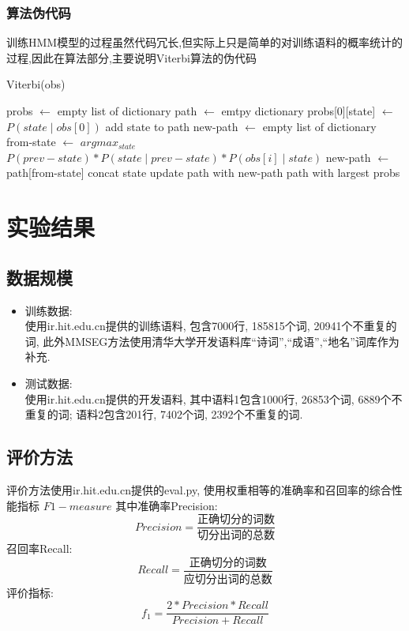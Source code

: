 \documentclass[titlepage]{article}
\begin{document}
\newpage
\subsubsection{算法伪代码}
训练HMM模型的过程虽然代码冗长,但实际上只是简单的对训练语料的概率统计的过程,因此在算法部分,主要说明Viterbi算法的伪代码

\begin{algorithm}[H]
    \renewcommand{\thealgorithm}{}
    \caption{Viterbi(obs)}
    \begin{algorithmic}[1]
        \STATE probs $\leftarrow$ empty list of dictionary
        \STATE path $\leftarrow$ emtpy dictionary
        \STATE probs[0][state] $\leftarrow$ $P(state\mathrel|obs[0])$
        \STATE add state to path
        \ENDFOR
        \STATE new-path $\leftarrow$ empty list of dictionary
        \STATE from-state $\leftarrow$ $argmax_{state}$ $P(prev-state) * P(state\mathrel|prev-state) * P(obs[i]\mathrel|state)$
        \STATE new-path $\leftarrow$ path[from-state] concat state
        \ENDFOR
        \STATE update path with new-path
        \ENDFOR
        \RETURN path with largest probs
    \end{algorithmic}
\end{algorithm}
\section{实验结果}
\subsection{数据规模}
\begin{itemize}
    \item 训练数据:\\[1em]
        使用ir.hit.edu.cn提供的训练语料, 包含7000行, 185815个词, 20941个不重复的词, 此外MMSEG方法使用清华大学开发语料库``诗词'',``成语'',``地名''词库作为补充.\\
    \item 测试数据:\\[1em]
        使用ir.hit.edu.cn提供的开发语料, 其中语料1包含1000行, 26853个词, 6889个不重复的词; 语料2包含201行, 7402个词, 2392个不重复的词.
\end{itemize}
\subsection{评价方法}
评价方法使用ir.hit.edu.cn提供的eval.py, 使用权重相等的准确率和召回率的综合性能指标 $F1-measure$
其中准确率Precision:
$$
Precision = \frac{\texttt{正确切分的词数}}{\texttt{切分出词的总数}}
$$
召回率Recall:
$$
Recall = \frac{\texttt{正确切分的词数}}{\texttt{应切分出词的总数}}
$$
评价指标:
$$
f_1 = \frac{2 * Precision * Recall}{Precision + Recall}
$$
\end{document}
